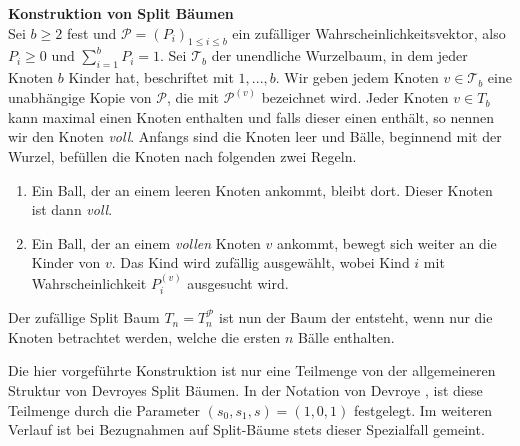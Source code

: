 \textbf{\fontsize{14}{18}\selectfont Konstruktion von Split Bäumen}\\
Sei $b \geq 2$ fest und $\mathcal{P} = (P_i)_{1 \leq i \leq b}$ ein zufälliger Wahrscheinlichkeitsvektor, also $P_i \geq 0$ und $\sum_{i=1}^{b}P_i = 1$. Sei $\mathcal{T}_b$ der unendliche Wurzelbaum, in dem jeder Knoten $b$ Kinder hat, beschriftet mit $1,...,b$. Wir geben jedem Knoten $v \in \mathcal{T}_b$ eine unabhängige Kopie von $\mathcal{P}$, die mit $\mathcal{P}^{(v)}$ bezeichnet wird. Jeder Knoten $v \in T_b$ kann maximal einen Knoten enthalten und falls dieser einen enthält, so nennen wir den Knoten \textit{voll}. Anfangs sind die Knoten leer und Bälle, beginnend mit der Wurzel, befüllen die Knoten nach folgenden zwei Regeln.
\begin{enumerate}
    \item Ein Ball, der an einem leeren Knoten ankommt, bleibt dort. Dieser Knoten ist dann \textit{voll}.
    \item Ein Ball, der an einem \textit{vollen} Knoten $v$ ankommt, bewegt sich weiter an die Kinder von $v$. Das Kind wird zufällig ausgewählt, wobei Kind $i$ mit Wahrscheinlichkeit $P_i^{(v)}$ ausgesucht wird.
\end{enumerate}
Der zufällige Split Baum $T_n = T_n^{\mathcal{P}}$ ist nun der Baum der entsteht, wenn nur die Knoten betrachtet werden, welche die ersten $n$ Bälle enthalten.
\begin{Bemerkung}
    Die hier vorgeführte Konstruktion ist nur eine Teilmenge von der allgemeineren Struktur von Devroyes Split Bäumen. In der Notation von Devroye \cite{devroye1998universal}, ist diese Teilmenge durch die Parameter $(s_0,s_1,s) = (1,0,1)$ festgelegt. Im weiteren Verlauf ist bei Bezugnahmen auf Split-Bäume stets dieser Spezialfall gemeint.
\end{Bemerkung}

